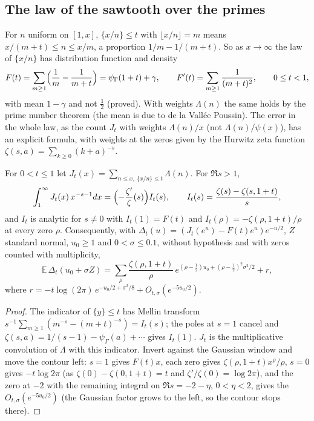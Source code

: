 \subsection{The law of the sawtooth over the primes}

For $n$ uniform on $[1,x]$, $\{x/n\}\le t$ with $\lfloor x/n\rfloor=m$ means $x/(m+t)\le n\le x/m$, a proportion $1/m-1/(m+t)$. So as $x\to\infty$ the law of $\{x/n\}$ has distribution function and density
\[
F(t)=\sum_{m\ge1}\Bigl(\frac1m-\frac1{m+t}\Bigr)=\psi_\Gamma(1+t)+\gamma,\qquad F'(t)=\sum_{m\ge1}\frac1{(m+t)^2},\qquad0\le t<1,
\]
with mean $1-\gamma$ and not $\tfrac12$ (proved). With weights $\Lambda(n)$ the same holds by the prime number theorem (the mean is due to de la Vall\'ee Poussin). The error in the whole law, as the count $J_t$ with weights $\Lambda(n)/x$ (not $\Lambda(n)/\psi(x)$), has an explicit formula, with weights at the zeros given by the Hurwitz zeta function $\zeta(s,a)=\sum_{k\ge0}(k+a)^{-s}$.

\begin{theorem}\label{sw:thm:hurwitz}
For $0<t\le1$ let $J_t(x)=\sum_{n\le x,\ \{x/n\}\le t}\Lambda(n)$. For $\Re s>1$,
\[
\int_1^\infty J_t(x)\,x^{-s-1}dx=\Bigl(-\frac{\zeta'}{\zeta}(s)\Bigr)I_t(s),\qquad I_t(s)=\frac{\zeta(s)-\zeta(s,1+t)}s,
\]
and $I_t$ is analytic for $s\ne0$ with $I_t(1)=F(t)$ and $I_t(\rho)=-\zeta(\rho,1+t)/\rho$ at every zero $\rho$. Consequently, with $\Delta_t(u)=(J_t(e^u)-F(t)e^u)e^{-u/2}$, $Z$ standard normal, $u_0\ge1$ and $0<\sigma\le0.1$, without hypothesis and with zeros counted with multiplicity,
\[
\mathbb E\,\Delta_t(u_0+\sigma Z)=\sum_\rho\frac{\zeta(\rho,1+t)}\rho\,e^{(\rho-\frac12)u_0+(\rho-\frac12)^2\sigma^2/2}+r,
\]
where $r=-t\log(2\pi)\,e^{-u_0/2+\sigma^2/8}+O_{t,\sigma}(e^{-5u_0/2})$.
\end{theorem}

\begin{proof}
The indicator of $\{y\}\le t$ has Mellin transform $s^{-1}\sum_{m\ge1}(m^{-s}-(m+t)^{-s})=I_t(s)$; the poles at $s=1$ cancel and $\zeta(s,a)=1/(s-1)-\psi_\Gamma(a)+\cdots$ gives $I_t(1)$. $J_t$ is the multiplicative convolution of $\Lambda$ with this indicator. Invert against the Gaussian window and move the contour left: $s=1$ gives $F(t)x$, each zero gives $\zeta(\rho,1+t)x^\rho/\rho$, $s=0$ gives $-t\log2\pi$ (as $\zeta(0)-\zeta(0,1+t)=t$ and $\zeta'/\zeta(0)=\log2\pi$), and the zero at $-2$ with the remaining integral on $\Re s=-2-\eta$, $0<\eta<2$, gives the $O_{t,\sigma}(e^{-5u_0/2})$ (the Gaussian factor grows to the left, so the contour stops there).
\end{proof}

